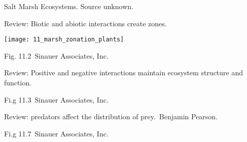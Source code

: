 \documentclass[t]{beamer}
\begin{document}

{
\begin{frame}[b]{Salt Marsh Ecosystems.}
\hfill\tiny\textcolor{green4}{Source unknown.}
\end{frame}
}
%
\begin{frame}[t]{Review: Biotic and abiotic interactions create zones.}

	\texttt{[image: 11\_marsh\_zonation\_plants]}


	\vfilll
	
	\hfill \tiny Fig. 11.2 \textcopyright\,Sinauer Associates, Inc.
\end{frame}
%
{
\begin{frame}[b]{Review: Positive and negative interactions maintain ecosystem structure and function.}

	\hfill \tiny Fi.g 11.3 \textcopyright\,Sinauer Associates, Inc.
\end{frame}
}
%
{
\begin{frame}[b]{Review: predators affect the distribution of prey.}
\tiny\textcopyright\,Benjamin Pearson.
\end{frame}
}
%
{
\begin{frame}[b]

	\hfill \tiny Fi.g 11.7 \textcopyright\,Sinauer Associates, Inc.
\end{frame}
}
\end{document}
